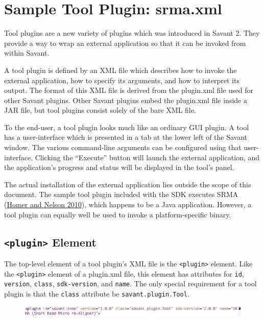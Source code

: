 \documentclass[times,11pt]{report}
\begin{document}
\chapter{Sample Tool Plugin: srma.xml}
\label{SampleToolPlugin}
Tool plugins are a new variety of plugins which was introduced in Savant 2.  They provide a way to wrap an external application so that it can be invoked from within Savant.

A tool plugin is defined by an XML file which describes how to invoke the external application, how to specify its arguments, and how to interpret its output.  The format of this XML file is derived from the plugin.xml file used for other Savant plugins.  Other Savant plugins embed the plugin.xml file inside a JAR file, but tool plugins consist solely of the bare XML file.

To the end-user, a tool plugin looks much like an ordinary GUI plugin.  A tool has a user-interface which is presented in a tab at the lower left of the Savant window.  The various command-line arguments can be configured using that user-interface.  Clicking the ``Execute'' button will launch the external application, and the application's progress and status will be displayed in the tool's panel.

The actual installation of the external application lies outside the scope of this document.  The sample tool plugin included with the SDK executes SRMA (\href{http://dx.doi.org/10.1186/gb-2010-11-10-r99}{Homer and Nelson 2010}), which happens to be a Java application.  However, a tool plugin can equally well be used to invoke a platform-specific binary.

\section{{\tt\textless plugin\textgreater} Element}
The top-level element of a tool plugin's XML file is the {\tt\textless plugin\textgreater} element.  Like the {\tt\textless plugin\textgreater} element of a plugin.xml file, this element has attributes for {\tt id}, {\tt version}, {\tt class}, {\tt sdk-version}, and {\tt name}.  The only special requirement for a tool plugin is that the {\tt class} attribute be {\tt savant.plugin.Tool}.

\begin{figure}[h!]
\begin{center}
\includegraphics[type=png,ext=.png,read=.png,width=15cm]{images/ToolPluginXML}
\end{center}
\end{figure}
\end{document}
